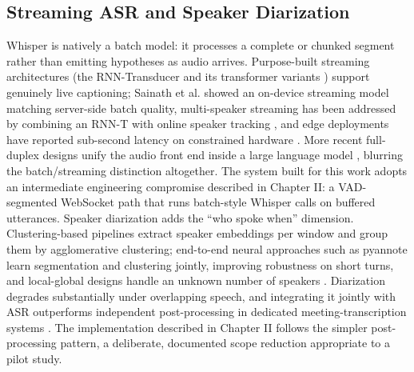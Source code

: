 \documentclass[12pt]{report}
\begin{document}
\subsection{Streaming ASR and Speaker Diarization}
Whisper is natively a batch model: it processes a complete or chunked segment rather than emitting hypotheses as audio arrives. Purpose-built streaming architectures (the RNN-Transducer and its transformer variants \cite{moritz2020streaming,tsunoo2021streaming,chen2021developing}) support genuinely live captioning; Sainath et al. \cite{sainath2020streaming} showed an on-device streaming model matching server-side batch quality, multi-speaker streaming has been addressed by combining an RNN-T with online speaker tracking \cite{sklyar2021streaming}, and edge deployments have reported sub-second latency on constrained hardware \cite{dileo2025realtime}. More recent full-duplex designs unify the audio front end inside a large language model \cite{li2026uaf}, blurring the batch/streaming distinction altogether. The system built for this work adopts an intermediate engineering compromise described in Chapter II: a VAD-segmented WebSocket path that runs batch-style Whisper calls on buffered utterances.
Speaker diarization adds the \enquote{who spoke when} dimension. Clustering-based pipelines extract speaker embeddings per window and group them by agglomerative clustering; end-to-end neural approaches such as pyannote \cite{bredin2020pyannote} learn segmentation and clustering jointly, improving robustness on short turns, and local-global designs handle an unknown number of speakers \cite{maiti2021endtoend}. Diarization degrades substantially under overlapping speech, and integrating it jointly with ASR outperforms independent post-processing in dedicated meeting-transcription systems \cite{raj2021integration,yoshioka2019advances,wang2021exploring}. The implementation described in Chapter II follows the simpler post-processing pattern, a deliberate, documented scope reduction appropriate to a pilot study.
\end{document}
